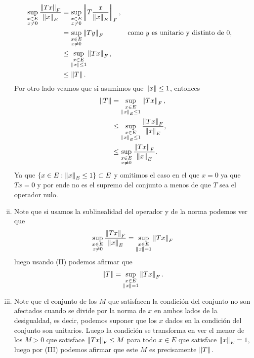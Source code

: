 \begin{homeworkProblem}
\begin{solution}
\begin{enumerate}[(i)]
        \begin{align*}
          \sup_{\substack{x\in E\\x\neq 0}}\frac{\left\|Tx\right\|_{F}}{\left\|x\right\|_{E}}&=\sup_{\substack{x\in E\\x\neq 0}}\left\|T\frac{x}{\left\|x\right\|_{E}}\right\|_{F},\\
          &=\sup_{\substack{x\in E\\x\neq 0}}\left\|Ty\right\|_{F} &&\text{como $y$ es unitario y distinto de $0$},\\
          &\leq \sup_{\substack{x\in E\\\left\|x\right\|\leq 1}}\left\|Tx\right\|_{F},\\
          &\leq \left\|T\right\|.
        \end{align*}
        Por otro lado veamos que si asumimos que $\left\|x\right\|\leq 1$, entonces
        \begin{align*}
          \left\|T\right\|&= \sup_{\substack{x\in E\\\left\|x\right\|_{E}\leq 1}}\left\|Tx\right\|_{F},\\
          &\leq \sup_{\substack{x\in E\\ \left\|x\right\|_{E}\leq 1}}\frac{\left\|Tx\right\|_{F}}{\left\|x\right\|_{E}},\\
          &\leq \sup_{\substack{x\in E\\x\neq 0}}\frac{\left\|Tx\right\|_{F}}{\left\|x\right\|_{E}}.
        \end{align*}
        Ya que $\{x\in E:\left\|x\right\|_{E}\leq 1\}\subset E$ y omitimos el caso en el que $x=0$ ya que $Tx=0$ y por ende no es el supremo del conjunto a menos de que $T$ sea el operador nulo.
      \item Note que si usamos la sublinealidad del operador y de la norma podemos ver que
        \begin{align*}
          \sup_{\substack{x\in E\\x\neq 0}}\frac{\left\|Tx\right\|_{F}}{\left\|x\right\|_{E}}=\sup_{\substack{x\in E\\\left\|x\right\|=1}}\left\|Tx\right\|_{F}
        \end{align*}
        luego usando (II) podemos afirmar que
        \begin{align*}
          \left\|T\right\|=\sup_{\substack{x\in E\\\left\|x\right\|=1}}\left\|Tx\right\|_{F}.
        \end{align*}
      \item Note que el conjunto de los $M$ que satisfacen la condición del conjunto no son afectados cuando se divide por la norma de $x$ en ambos lados de la desigualdad, es decir, podemos suponer que los $x$ dados en la condición del conjunto son unitarios. Luego la condición se transforma en ver el menor de los $M>0$ que satisface $\left\|Tx\right\|_{F}\leq M$ para todo $x\in E$ que satisface $\left\|x\right\|_{E}=1$, luego por (III) podemos afirmar que este $M$ es precisamente $\left\|T\right\|$. 
    \end{enumerate}
  \end{solution}
\end{homeworkProblem}
